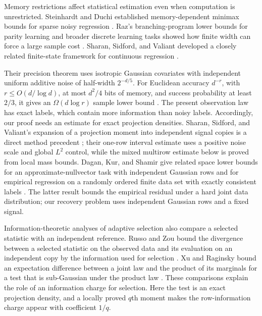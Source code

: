 Memory restrictions affect statistical estimation even when
computation is unrestricted.  Steinhardt and Duchi established
memory-dependent minimax bounds for sparse noisy regression
\cite{SteinhardtDuchi2015}.  Raz's branching-program lower bounds
for parity learning and broader discrete learning tasks showed how
finite width can force a large sample cost \cite{Raz2016,Raz2017}.
Sharan, Sidford, and Valiant developed a closely related finite-state
framework for continuous regression \cite{SSV2019}.

Their precision theorem uses isotropic Gaussian covariates with
independent uniform additive noise of half-width \(2^{-d/5}\).
For Euclidean accuracy \(d^{-r}\), with \(r\le O(d/\log d)\),
at most \(d^2/4\) bits of memory, and success probability at least
\(2/3\), it gives an \(\Omega(d\log r)\) sample lower bound
\cite[Theorem~1]{SSV2019}.  The present observation law has exact
labels, which contain more information than noisy labels.
Accordingly, our proof needs an estimate for exact projection
densities.  Sharan, Sidford, and Valiant's expansion of a projection
moment into independent signal copies is a direct method precedent
\cite[Section~7, Lemma~12]{SSV2019}; their one-row interval estimate
uses a positive noise scale and global \(L^2\) control, while the
mixed multirow estimate below is proved from local mass bounds.
Dagan, Kur, and Shamir give related space lower bounds for an
approximate-nullvector task with independent Gaussian rows and for
empirical regression on a randomly ordered finite data set with
exactly consistent labels \cite[Theorems~3 and~10]{DKS2019}.
The latter result bounds the empirical residual under a hard joint
data distribution; our recovery problem uses independent Gaussian
rows and a fixed signal.

Information-theoretic analyses of adaptive selection also compare a
selected statistic with an independent reference.  Russo and Zou
bound the divergence between a selected statistic on the observed
data and its evaluation on an independent copy by the information
used for selection \cite[Section~2.4, Proposition~4]{RussoZou2016}.
Xu and Raginsky bound an expectation difference between a joint law
and the product of its marginals for a test that is sub-Gaussian
under the product law
\cite[Section~3.1, Lemma~1]{XuRaginsky2017}.  These comparisons
explain the role of an information charge for selection.  Here the
test is an exact projection density, and a locally proved \(q\)th
moment makes the row-information charge appear with coefficient
\(1/q\).

